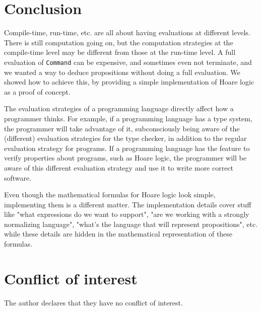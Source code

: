 \documentclass{article}
\begin{document}
\section{Conclusion}

Compile-time, run-time, etc. are all about having evaluations at different levels. There is still computation going on, but the computation strategies at the compile-time level may be different from those at the run-time level. A full evaluation of \texttt{Command} can be expensive, and sometimes even not terminate, and we wanted a way to deduce propositions without doing a full evaluation. We showed how to achieve this, by providing a simple implementation of Hoare logic as a proof of concept.

The evaluation strategies of a programming language directly affect how a programmer thinks. For example, if a programming language has a type system, the programmer will take advantage of it, subconsciously being aware of the (different) evaluation strategies for the type checker, in addition to the regular evaluation strategy for programs. If a programming language has the feature to verify properties about programs, such as Hoare logic, the programmer will be aware of this different evaluation strategy and use it to write more correct software.

Even though the mathematical formulas for Hoare logic look simple, implementing them is a different matter. The implementation details cover stuff like "what expressions do we want to support", "are we working with a strongly normalizing language", "what's the language that will represent propositions", etc. while these details are hidden in the mathematical representation of these formulas.

\section{Conflict of interest}

The author declares that they have no conflict of interest.
\end{document}

